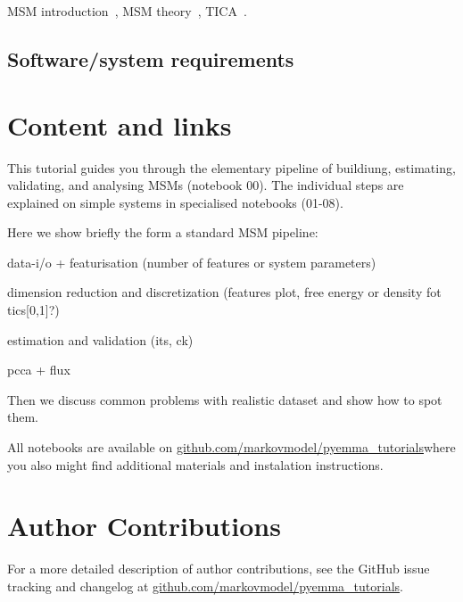 \documentclass[9pt,tutorial,lineno,onehalfspacing]{livecoms}
\newcommand{\githubrepository}{\url{github.com/markovmodel/pyemma_tutorials}}
\begin{document}
MSM introduction~\cite{msm-brooke}, MSM theory~\cite{msm-jhp,msm-book}, TICA~\cite{tica,tica3,tica2}.

\subsection{Software/system requirements}



\section{Content and links}

This tutorial guides you through the elementary pipeline of buildiung, estimating, validating, and analysing MSMs (notebook 00). The individual steps are explained on simple systems in specialised notebooks (01-08).

Here we show briefly the form a standard MSM pipeline:

data-i/o + featurisation (number of features or system parameters)

dimension reduction and discretization (features plot, free energy or density fot tics[0,1]?)

estimation and validation (its, ck)

pcca + flux

Then we discuss common problems with realistic dataset and show how to spot them.

All notebooks are available on \githubrepository where you also might find additional materials and instalation instructions.


\section{Author Contributions}
%
For a more detailed description of author contributions, see the GitHub issue tracking and changelog at \githubrepository.
\end{document}

